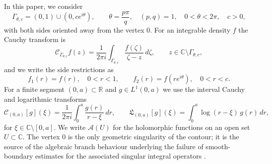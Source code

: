 \documentclass[pdflatex,sn-mathphys-num]{sn-jnl}%
\newcommand{\C}{\mathbb{C}}
\newcommand{\R}{\mathbb{R}}
\newcommand{\Cau}{\mathcal{C}}
\newcommand{\Lcx}{\mathfrak{L}}
\newcommand{\Gw}{\Gamma_{\theta,c}}
\newcommand{\Ahol}{\mathcal{A}}
\theoremstyle{thmstyleone}
\theoremstyle{thmstyletwo}
\theoremstyle{thmstylethree}
\begin{document}
In this paper, we consider \begin{equation}\label{eq:wedge}
  \Gw=(0,1)\cup(0,ce^{i\theta}),\qquad
  \theta=\frac{p\pi}{q},\quad (p,q)=1,\quad 0<\theta<2\pi,\quad c>0,
\end{equation}
with both sides oriented away from the vertex $0$. For an integrable density
$f$ the Cauchy transform is
\begin{equation}\label{eq:cauchy-def}
  \Cau_{\Gw}f(z)=\frac{1}{2\pi i}\int_{\Gw}\frac{f(\zeta)}{\zeta-z}\,d\zeta,
  \qquad z\in\C\setminus\Gw ,
\end{equation}
and we write the side restrictions as
\begin{equation}\label{eq:sides}
  f_1(r)=f(r),\quad 0<r<1,\qquad f_2(r)=f(re^{i\theta}),\quad 0<r<c .
\end{equation}
For a finite segment $(0,a)\subset\R$ and $g\in L^1(0,a)$ we use the interval
Cauchy and logarithmic transforms
\begin{equation}\label{eq:interval}
  \Cau_{(0,a)}[g](\xi)=\frac{1}{2\pi i}\int_0^a\frac{g(r)}{r-\xi}\,dr,
  \qquad
  \Lcx_{(0,a)}[g](\xi)=\int_0^a\log(r-\xi)\,g(r)\,dr,
\end{equation}
for $\xi\in\C\setminus[0,a]$. We write $\Ahol(U)$ for the holomorphic functions
on an open set $U\subset\C$. The vertex $0$ is the only geometric singularity of
the contour; it is the source of the algebraic branch behaviour underlying the
failure of smooth-boundary estimates for the associated singular integral
operators \cite{kerzman1978cauchy,bolt2015kerzman}.
\end{document}
